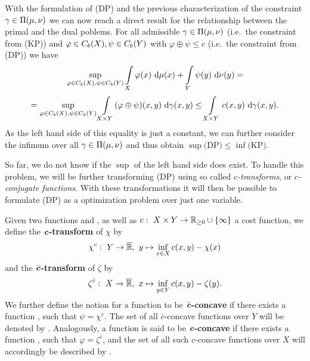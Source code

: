With the formulation of (DP) and the previous characterization of the constraint $\gamma \in \TP{\mu}{\nu}$ we can now reach a direct result for the relationship between the primal and the dual poblems. For all admissible $\gamma \in \TP{\mu}{\nu}$ (i.e.~the constraint from (KP)) and $\varphi \in \CF[b]{X}, \psi \in \CF[b]{Y}$ with $\varphi \oplus \psi \le c$ (i.e.~the constraint from (DP)) we have
\[ \sup\limits_{\varphi \in \CF[b]{X}, \psi \in \CF[b]{Y}} \int\limits_{X} \varphi(x)~\Dx{\mu} + \int\limits_{Y} \psi(y)~\Dx[y]{\nu} = \]
\[ = \sup\limits_{\varphi \in \CF[b]{X}, \psi \in \CF[b]{Y}} \int\limits_{X \times Y} (\varphi \oplus \psi)(x, y)~\Dx[x, y]{\gamma} \le \int\limits_{X \times Y} c(x, y)~\Dx[x, y]{\gamma}. \]
As the left hand side of this equality is just a constant, we can further consider the infimum over all $\gamma \in \TP{\mu}{\nu}$ and thus obtain $\sup \text{(DP)} \le \inf \text{(KP)}$.

So far, we do not know if the $\sup$ of the left hand side does exist. To handle this problem, we will be further transforming (DP) using so called \textit{$c$-transforms}, or \textit{$c$-conjugate functions}. With these transformations it will then be possible to formulate (DP) as a optimization problem over just one variable.

\begin{definition}\label{cTrafo}
	Given two functions  and , as well as $\map[c]{X \times Y}{\RZero{} \cup{} \{ \infty \}}$ a cost function, we define the \textbf{$\text{\textbf{\textit{c}}}$-transform} of $\chi$ by
	\[ \map[\chi^c]{Y}{\Rbar},~y \mapsto \inf\limits_{x \in X} c(x, y) - \chi(x) \]
	and the \textbf{$\bar{\text{\textbf{\textit{c}}}}$-transform} of $\zeta$ by
	\[ \map[\zeta^{\bar{c}}]{X}{\Rbar},~x \mapsto \inf\limits_{y \in Y} c(x, y) - \zeta(y). \]
	We further define the notion for a function  to be \textbf{$\bar{\text{\textbf{\textit{c}}}}$-concave} if there exists a function , such that $\psi = \chi^c$. The set of all $\bar{c}$-concave functions over $Y$ will be denoted by . Analogously, a function  is said to be \textbf{$\text{\textbf{\textit{c}}}$-concave} if there exists a function , such that $\varphi = \zeta^{\bar{c}}$, and the set of all such $c$-concave functions over $X$ will accordingly be described by .
\end{definition}

